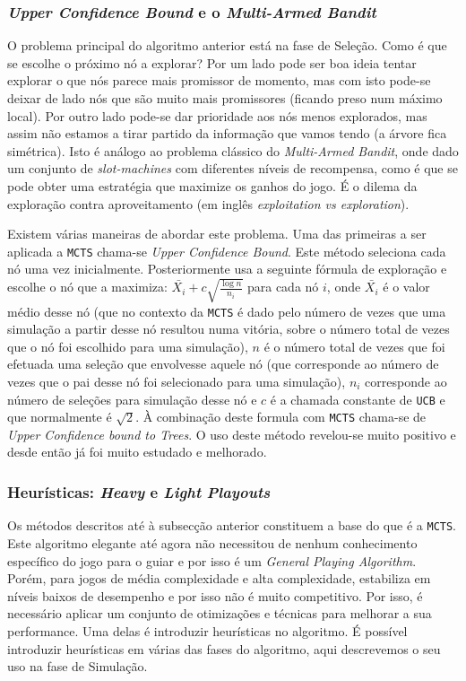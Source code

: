 \documentclass[12pt,a4paper,oneside]{article}
\begin{document}
\subsubsection{\textit{Upper Confidence Bound} e o \textit{Multi-Armed Bandit}}

O problema principal do algoritmo anterior está na fase de
Seleção. Como é que se escolhe o próximo nó a explorar? Por um lado
pode ser boa ideia tentar explorar o que nós parece mais promissor de
momento, mas com isto pode-se deixar de lado nós que são muito mais
promissores (ficando preso num máximo local). Por outro lado pode-se
dar prioridade aos nós menos explorados, mas assim não estamos a tirar
partido da informação que vamos tendo (a árvore fica simétrica). Isto
é análogo ao problema clássico do \textit{Multi-Armed Bandit}, onde
dado um conjunto de \textit{slot-machines} com diferentes níveis de
recompensa, como é que se pode obter uma estratégia que maximize os
ganhos do jogo. É o dilema da exploração contra aproveitamento (em
inglês \textit{exploitation vs exploration}).

Existem várias maneiras de abordar este problema. Uma das primeiras a
ser aplicada a \texttt{MCTS} chama-se \textit{Upper Confidence
  Bound}. Este método seleciona cada nó uma vez
inicialmente. Posteriormente usa a seguinte fórmula de exploração e
escolhe o nó que a maximiza: $\bar{X_i} + c
\sqrt{\frac{\log{n}}{n_i}}$ para cada nó $i$, onde $\bar{X_i}$ é o
valor médio desse nó (que no contexto da \texttt{MCTS} é dado pelo
número de vezes que uma simulação a partir desse nó resultou numa
vitória, sobre o número total de vezes que o nó foi escolhido para uma
simulação), $n$ é o número total de vezes que foi efetuada uma seleção
que envolvesse aquele nó (que corresponde ao número de vezes que o pai
desse nó foi selecionado para uma simulação), $n_i$ corresponde ao
número de seleções para simulação desse nó e $c$ é a chamada constante
de \texttt{UCB} e que normalmente é $\sqrt{2}$. À combinação deste
formula com \texttt{MCTS} chama-se de \textit{Upper Confidence bound
  to Trees}. O uso deste método revelou-se muito positivo e desde
então já foi muito estudado e melhorado.

\subsubsection{Heurísticas: \textit{Heavy} e \textit{Light} \textit{Playouts}}

Os métodos descritos até à subsecção anterior constituem a base do que
é a \texttt{MCTS}. Este algoritmo elegante até agora não necessitou de
nenhum conhecimento específico do jogo para o guiar e por isso é um
\textit{General Playing Algorithm}. Porém, para jogos de média
complexidade e alta complexidade, estabiliza em níveis baixos de
desempenho e por isso não é muito competitivo. Por isso, é necessário
aplicar um conjunto de otimizações e técnicas para melhorar a sua
performance. Uma delas é introduzir heurísticas no algoritmo. É
possível introduzir heurísticas em várias das fases do algoritmo, aqui
descrevemos o seu uso na fase de Simulação.
\end{document}
